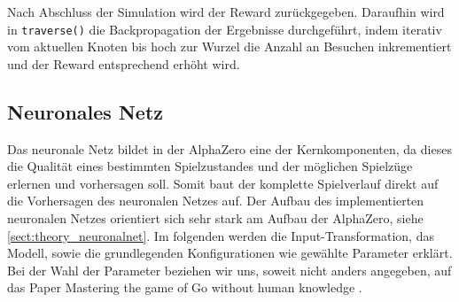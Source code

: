 \documentclass[12pt,a4paper]{article}
\begin{document}
Nach Abschluss der Simulation wird der Reward zurückgegeben. Daraufhin wird in \texttt{traverse()} die Backpropagation der Ergebnisse durchgeführt, indem iterativ vom aktuellen Knoten bis hoch zur Wurzel die Anzahl an Besuchen inkrementiert und der Reward entsprechend erhöht wird.

\subsection{Neuronales Netz}
Das neuronale Netz bildet in der AlphaZero eine der Kernkomponenten, da dieses die Qualität eines bestimmten Spielzustandes und der möglichen Spielzüge erlernen und vorhersagen soll. Somit baut der komplette Spielverlauf direkt auf die Vorhersagen des neuronalen Netzes auf. Der Aufbau des implementierten neuronalen Netzes orientiert sich sehr stark am Aufbau der AlphaZero, siehe \ref{sect:theory_neuronalnet}. Im folgenden werden die Input-Transformation, das Modell, sowie die grundlegenden Konfigurationen wie gewählte Parameter erklärt. Bei der Wahl der Parameter beziehen wir uns, soweit nicht anders angegeben, auf das Paper \glqq Mastering the game of Go without human knowledge\grqq{} \cite{Silver2017}. \\
\end{document}
